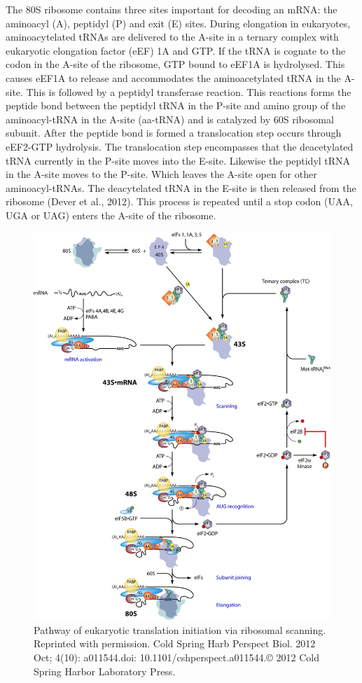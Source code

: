 \documentclass[12pt,openany]{book}
\begin{document}
The 80S ribosome contains three sites important for decoding an mRNA:
the aminoacyl (A), peptidyl (P) and exit (E) sites. During elongation in
eukaryotes, aminoacytelated tRNAs are delivered to the A-site in a
ternary complex with eukaryotic elongation factor (eEF) 1A and GTP. If
the tRNA is cognate to the codon in the A-site of the ribosome, GTP
bound to eEF1A is hydrolysed. This causes eEF1A to release and
accommodates the aminoacetylated tRNA in the A-site. This is followed by
a peptidyl transferase reaction. This reactions forms the peptide bond
between the peptidyl tRNA in the P-site and amino group of the
aminoacyl-tRNA in the A-site (aa-tRNA) and is catalyzed by 60S ribosomal
subunit. After the peptide bond is formed a translocation step occurs
through eEF2-GTP hydrolysis. The translocation step encompasses that the
deacetylated tRNA currently in the P-site moves into the E-site.
Likewise the peptidyl tRNA in the A-site moves to the P-site. Which
leaves the A-site open for other aminoacyl-tRNAs. The deacytelated tRNA
in the E-site is then released from the ribosome (Dever et al., 2012).
This process is repeated until a stop codon (UAA, UGA or UAG) enters the
A-site of the ribosome.

\begin{figure}[ht]
\centering
\includegraphics[width=1.0\linewidth,height=0.8\textheight]{./figures/initiation.jpg} 
  \caption{Pathway of eukaryotic translation initiation via ribosomal scanning. Reprinted with permission. Cold Spring Harb Perspect Biol. 2012 Oct; 4(10): a011544.doi: 10.1101/cshperspect.a011544.© 2012 Cold Spring Harbor Laboratory Press.
  \label{fig:initiation}}
\end{figure}
\end{document}
